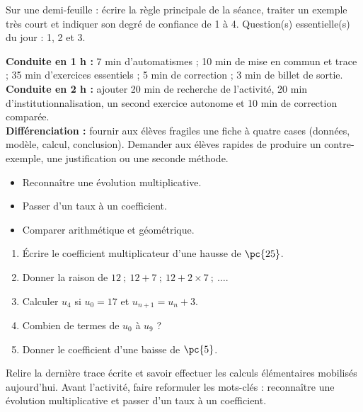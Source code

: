 \begin{exitticket}[3 minutes]Sur une demi-feuille : écrire la règle principale de la séance, traiter un exemple très court et indiquer son degré de confiance de 1 à 4. Question(s) essentielle(s) du jour : 1, 2 et 3.\end{exitticket}

\ifmxteacher
\begin{method}
\textbf{Conduite en 1 h :} 7 min d'automatismes ; 10 min de mise en commun et trace ; 35 min d'exercices essentiels ; 5 min de correction ; 3 min de billet de sortie.\\
\textbf{Conduite en 2 h :} ajouter 20 min de recherche de l'activité, 20 min d'institutionnalisation, un second exercice autonome et 10 min de correction comparée.\\
\textbf{Différenciation :} fournir aux élèves fragiles une fiche à quatre cases (données, modèle, calcul, conclusion). Demander aux élèves rapides de produire un contre-exemple, une justification ou une seconde méthode.
\end{method}
\fi
{}
    \begin{objectives}\begin{itemize}\item Reconnaître une évolution multiplicative.\item Passer d'un taux à un coefficient.\item Comparer arithmétique et géométrique.\end{itemize}\end{objectives}
    \begin{fluency}\begin{enumerate}\item Écrire le coefficient multiplicateur d'une hausse de $\pc{25}$. \item Donner la raison de $12\ ;\ 12+7\ ;\ 12+2\times7\ ;\ \ldots$. \item Calculer $u_4$ si $u_0=17$ et $u_{n+1}=u_n+3$. \item Combien de termes de $u_{0}$ à $u_{9}$ ? \item Donner le coefficient d'une baisse de $\pc{5}$. \end{enumerate}\end{fluency}
    \begin{prerequisites}Relire la dernière trace écrite et savoir effectuer les calculs élémentaires mobilisés aujourd'hui. Avant l'activité, faire reformuler les mots-clés : reconnaître une évolution multiplicative et passer d'un taux à un coefficient.\end{prerequisites}

